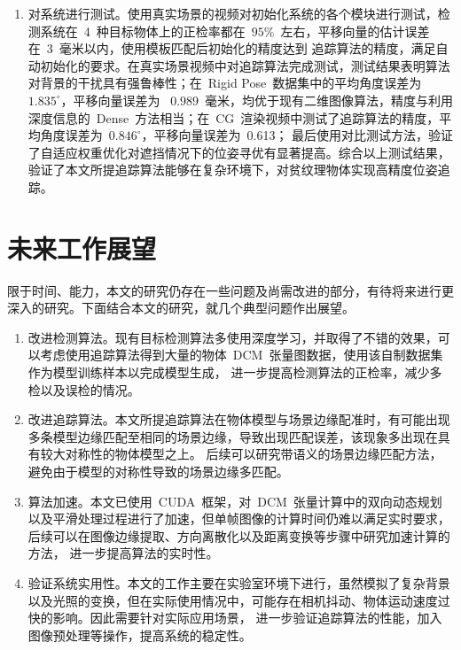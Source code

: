\begin{enumerate}
    \item 对系统进行测试。使用真实场景的视频对初始化系统的各个模块进行测试，检测系统在~4~种目标物体上的正检率都在~$95\%$~左右，平移向量的估计误差在~3~毫米以内，使用模板匹配后初始化的精度达到
    追踪算法的精度，满足自动初始化的要求。在真实场景视频中对追踪算法完成测试，测试结果表明算法对背景的干扰具有强鲁棒性；在~Rigid Pose~数据集中的平均角度误差为~$1.835^\circ$，平移向量误差为
    ~$0.989$~毫米，均优于现有二维图像算法，精度与利用深度信息的~Dense~方法相当；在~CG~渲染视频中测试了追踪算法的精度，平均角度误差为~$0.846^\circ$，平移向量误差为~0.613；
    最后使用对比测试方法，验证了自适应权重优化对遮挡情况下的位姿寻优有显著提高。综合以上测试结果，验证了本文所提追踪算法能够在复杂环境下，对贫纹理物体实现高精度位姿追踪。
    \end{enumerate}

\section{未来工作展望}
限于时间、能力，本文的研究仍存在一些问题及尚需改进的部分，有待将来进行更深入的研究。下面结合本文的研究，就几个典型问题作出展望。
\begin{enumerate}
    \item 改进检测算法。现有目标检测算法多使用深度学习，并取得了不错的效果，可以考虑使用追踪算法得到大量的物体~DCM~张量图数据，使用该自制数据集作为模型训练样本以完成模型生成，
    进一步提高检测算法的正检率，减少多检以及误检的情况。
    \item 改进追踪算法。本文所提追踪算法在物体模型与场景边缘配准时，有可能出现多条模型边缘匹配至相同的场景边缘，导致出现匹配误差，该现象多出现在具有较大对称性的物体模型之上。
    后续可以研究带语义的场景边缘匹配方法，避免由于模型的对称性导致的场景边缘多匹配。
    \item 算法加速。本文已使用~CUDA~框架，对~DCM~张量计算中的双向动态规划以及平滑处理过程进行了加速，但单帧图像的计算时间仍难以满足实时要求，后续可以在图像边缘提取、方向离散化以及距离变换等步骤中研究加速计算的方法，
    进一步提高算法的实时性。
    \item 验证系统实用性。本文的工作主要在实验室环境下进行，虽然模拟了复杂背景以及光照的变换，但在实际使用情况中，可能存在相机抖动、物体运动速度过快的影响。因此需要针对实际应用场景，
    进一步验证追踪算法的性能，加入图像预处理等操作，提高系统的稳定性。
    \end{enumerate}


\label{sec:all:future_work}
